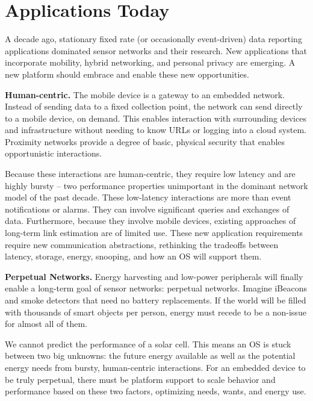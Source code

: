 \section{Applications Today}

A decade ago, stationary fixed rate (or occasionally event-driven) data 
reporting applications dominated sensor networks and their research. 
New applications that incorporate mobility, hybrid networking, and 
personal privacy are emerging. A new platform should embrace and enable 
these new opportunities.

\smallskip\noindent
\textbf{Human-centric.}
The mobile device is a gateway to an embedded network. Instead of
sending data to a fixed collection point, the network can send directly
to a mobile device, on demand. This enables interaction with
surrounding devices and infrastructure without needing to know
URLs or logging into a cloud system. Proximity networks provide a degree
of basic, physical security that enables opportunistic interactions.

Because these interactions are human-centric, they require low latency and
are highly bursty -- two performance properties unimportant in the
dominant network model of the past decade. These low-latency interactions
are more than event notifications or alarms. They can involve significant
queries and exchanges of data. Furthermore, because they involve mobile
devices, existing approaches of long-term link estimation are of limited use.
These new application requirements require new communication abstractions,
rethinking the tradeoffs between latency, storage, energy, snooping, and how
an OS will support them.

\smallskip\noindent
\textbf{Perpetual Networks.}
Energy harvesting and low-power peripherals will finally enable a
long-term goal of sensor networks: perpetual networks. Imagine
iBeacons and smoke detectors that need no battery replacements. If the world
will be filled with thousands of smart objects per person, energy must recede
to be a non-issue for almost all of them.

We cannot predict the performance of a solar cell. This means an OS
is stuck between two big unknowns: the future energy available as well as
the potential energy needs from bursty, human-centric interactions. For
an embedded device to be truly perpetual, there must be platform support to
scale behavior and performance based on these two factors, optimizing needs,
wants, and energy use.

